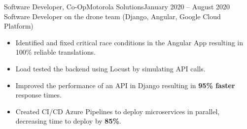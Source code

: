 \begin{cvsubsection}{Software Developer, Co-Op}{Motorola Solutions}{January 2020 -- August 2020}
	Software Developer on the drone team (Django, Angular, Google Cloud Platform)			
	\begin{itemize}
		\item Identified and fixed critical race conditions in the Angular App resulting in 100\% reliable translations.
		\item Load tested the backend using Locust by simulating API calls.
		\item Improved the performance of an API in Django resulting in \textbf{95\% faster} response times.
		\item Created CI/CD Azure Pipelines to deploy microservices in parallel, decreasing time to deploy by \textbf{85\%}.
	\end{itemize}
\end{cvsubsection}